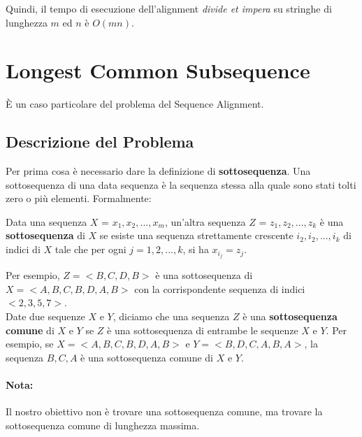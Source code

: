 Quindi, il tempo di esecuzione dell'alignment \emph{divide et impera} su
stringhe di lunghezza $m$ ed $n$ è $O(mn)$.

\section{Longest Common Subsequence}

È un caso particolare del problema del Sequence Alignment.

\subsection{Descrizione del Problema}

Per prima cosa è necessario dare la definizione di
\textbf{sottosequenza}. Una sottosequenza di una data sequenza è la
sequenza stessa alla quale sono stati tolti zero o più elementi.
Formalmente:\\

\begin{minipage}{\textwidth}
  \begin{myblockquote}
    Data una sequenza $X$ =
    $x_1, x_2, ..., x_m$, un'altra sequenza $Z$ = $z_1, z_2, ..., z_k$
    è una \textbf{sottosequenza} di $X$ se esiste una sequenza
    strettamente crescente $i_2, i_2, ..., i_k$ di indici di $X$ tale
    che per ogni $j = 1, 2, ..., k$, si ha $x_{i_j} = z_j$.
  \end{myblockquote}
\end{minipage}

Per esempio, $Z = <B, C, D, B>$ è una sottosequenza di
$X = < A, B, C, B, D, A, B>$ con la corrispondente sequenza di indici
$<2, 3, 5, 7>$.\\

Date due sequenze $X$ e $Y$, diciamo che una sequenza $Z$ è una
\textbf{sottosequenza comune} di $X$ e $Y$ se $Z$ è una
sottosequenza di entrambe le sequenze $X$ e $Y$. Per esempio, se
$X = <A,B,C,B,D,A,B>$ e $Y = <B,D,C,A,B,A>$, la sequenza $B,C,A$ è
una sottosequenza comune di $X$ e $Y$.

\paragraph*{Nota:} Il nostro obiettivo non è trovare una
sottosequenza comune, ma trovare la sottosequenza comune di lunghezza
massima.


